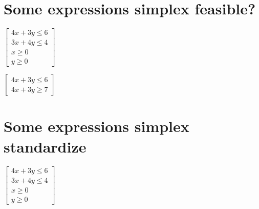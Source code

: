 \documentclass{article}
\begin{document}
\section{Some expressions simplex feasible?}

$\left[ 
\begin{array}{r}
4x+3y\leq 6 \\ 
3x+4y\leq 4 \\ 
x\geq 0 \\ 
y\geq 0%
\end{array}%
\right] $

$\left[ 
\begin{array}{c}
4x+3y\leq 6 \\ 
4x+3y\geq 7%
\end{array}%
\right] $

\section{Some expressions simplex standardize}

$\left[ 
\begin{array}{r}
4x+3y\leq 6 \\ 
3x+4y\leq 4 \\ 
x\geq 0 \\ 
y\geq 0%
\end{array}%
\right] $
\end{document}
